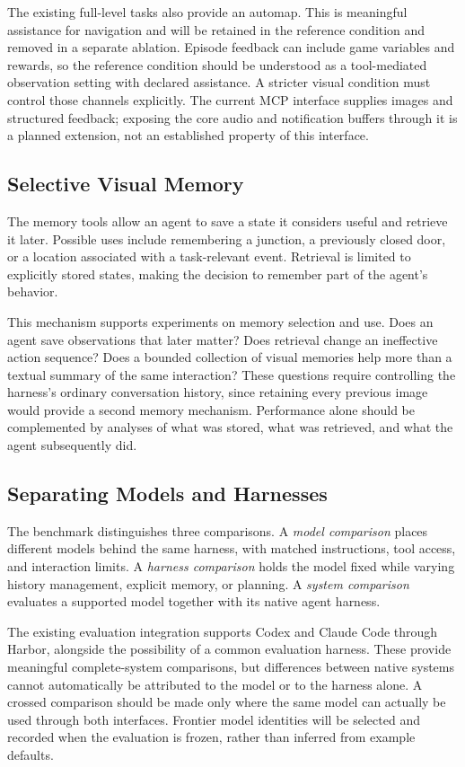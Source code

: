 The existing full-level tasks also provide an automap. This is meaningful assistance for navigation and will be retained in the reference condition and removed in a separate ablation. Episode feedback can include game variables and rewards, so the reference condition should be understood as a tool-mediated observation setting with declared assistance. A stricter visual condition must control those channels explicitly. The current MCP interface supplies images and structured feedback; exposing the core audio and notification buffers through it is a planned extension, not an established property of this interface.

\subsection{Selective Visual Memory}
The memory tools allow an agent to save a state it considers useful and retrieve it later. Possible uses include remembering a junction, a previously closed door, or a location associated with a task-relevant event. Retrieval is limited to explicitly stored states, making the decision to remember part of the agent's behavior.

This mechanism supports experiments on memory selection and use. Does an agent save observations that later matter? Does retrieval change an ineffective action sequence? Does a bounded collection of visual memories help more than a textual summary of the same interaction? These questions require controlling the harness's ordinary conversation history, since retaining every previous image would provide a second memory mechanism. Performance alone should be complemented by analyses of what was stored, what was retrieved, and what the agent subsequently did.

\subsection{Separating Models and Harnesses}
The benchmark distinguishes three comparisons. A \emph{model comparison} places different models behind the same harness, with matched instructions, tool access, and interaction limits. A \emph{harness comparison} holds the model fixed while varying history management, explicit memory, or planning. A \emph{system comparison} evaluates a supported model together with its native agent harness.

The existing evaluation integration supports Codex and Claude Code through Harbor, alongside the possibility of a common evaluation harness. These provide meaningful complete-system comparisons, but differences between native systems cannot automatically be attributed to the model or to the harness alone. A crossed comparison should be made only where the same model can actually be used through both interfaces. Frontier model identities will be selected and recorded when the evaluation is frozen, rather than inferred from example defaults.

